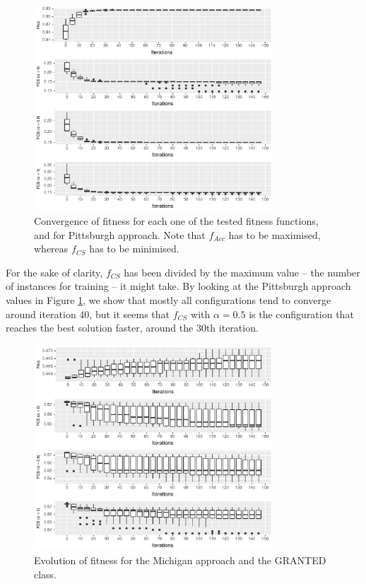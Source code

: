 \documentclass[runningheads]{llncs}
\begin{document}
\begin{figure}[h!tb]
\centering
\includegraphics[width=0.8\textwidth]{img/pittsburghItvsF.pdf}
\caption{Convergence of fitness for each one of the tested fitness
  functions, and for Pittsburgh approach. Note that $f_{Acc}$ has to
  be maximised, whereas $f_{CS}$ has to be minimised.}
\label{fig:pittsburghItvsF}
\end{figure}
%
For the sake of clarity, $f_{CS}$ has been divided by the maximum
value -- the number of instances for training -- it might take. By
looking at the Pittsburgh approach values in Figure
\ref{fig:pittsburghItvsF}, we show that mostly all configurations tend to converge around iteration 40, but it seems that $f_{CS}$ with
$\alpha = 0.5$ is the configuration that reaches the best solution
faster, around the 30th iteration.  

\begin{figure}[h!tb]
	\centering
	\includegraphics[width=0.8\textwidth]{img/michiganItvsF_allow.pdf}
	\caption{Evolution of fitness for the Michigan approach and the GRANTED class.}
	\label{fig:michiganItvsF_allow}
\end{figure}
\end{document}
